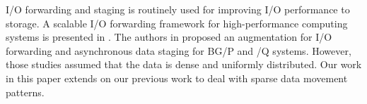 I/O forwarding and staging is routinely used for improving I/O performance to storage. A scalable I/O forwarding framework for high-performance computing systems is presented in \cite{Ali:IOForwarding}. The authors in \cite{Vishwanath:IOForwarding,Vishwanath:GLEAN}  proposed an augmentation for I/O forwarding and asynchronous data staging for BG/P and /Q systems. However, those studies assumed that the data is dense and uniformly distributed. Our work in this paper extends on our previous work \cite{Vishwanath:GLEAN} to deal with sparse data movement patterns.
